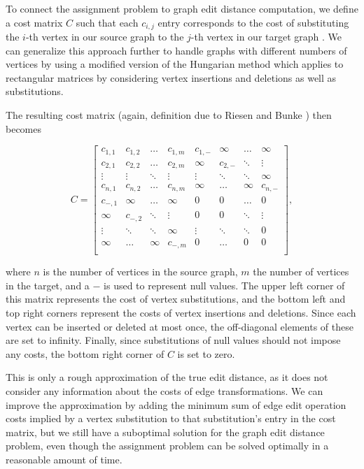 \documentclass[12pt]{thesis}
\theoremstyle{plain}
\theoremstyle{definition}
\theoremstyle{remark}
\begin{document}
To connect the assignment problem to graph edit distance computation, we define a cost matrix $C$ such that each $c_{i,j}$ entry corresponds to the cost of substituting the $i$-th vertex in our source graph to the $j$-th vertex in our target graph \cite{Riesen_2009}. We can generalize this approach further to handle graphs with different numbers of vertices by using a modified version of the Hungarian method which applies to rectangular matrices \cite{bourgeois1971extension} by considering vertex insertions and deletions as well as substitutions. 

The resulting cost matrix (again, definition due to Riesen and Bunke \cite{Riesen_2009}) then becomes 

\[
C = \left[
\begin{array}{cccc|cccc}
c_{1,1} & c_{1,2} & \dots & c_{1,m}     &     c_{1,-} & \infty & \dots & \infty \\
c_{2,1} & c_{2,2} & \dots & c_{2,m}     &     \infty & c_{2,-} & \ddots & \vdots \\
\vdots & \vdots & \ddots & \vdots          &     \vdots & \ddots & \ddots & \infty \\ 
c_{n,1} & c_{n,2} & \dots & c_{n,m}     &     \infty & \dots & \infty & c_{n,-} \\ \hline

c_{-,1} & \infty & \dots & \infty             &     0 & 0 & \dots & 0 \\ 
\infty & c_{-,2} & \ddots & \vdots          &     0 & 0 & \ddots & \vdots \\ 
\vdots & \ddots & \ddots & \infty           &     \vdots & \ddots & \ddots & 0\\ 
\infty & \dots & \infty & c_{-,m}            &    0 & \dots & 0 & 0 \\ 
\end{array}
\right],
\]

where $n$ is the number of vertices in the source graph, $m$ the number of vertices in the target, and a $-$ is used to represent null values. The upper left corner of this matrix represents the cost of vertex substitutions, and the bottom left and top right corners represent the costs of vertex insertions and deletions. Since each vertex can be inserted or deleted at most once, the off-diagonal elements of these are set to infinity. Finally, since substitutions of null values should not impose any costs, the bottom right corner of $C$ is set to zero.

This is only a rough approximation of the true edit distance, as it does not consider any information about the costs of edge transformations. We can improve the approximation by adding the minimum sum of edge edit operation costs implied by a vertex substitution to that substitution's entry in the cost matrix, but we still have a suboptimal solution for the graph edit distance problem, even though the assignment problem can be solved optimally in a reasonable amount of time.
\end{document}
